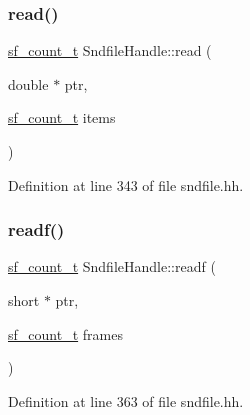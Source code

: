 \subsubsection{\texorpdfstring{read()}{read()}\hspace{0.1cm}{\footnotesize\ttfamily [4/4]}}
{\footnotesize\ttfamily \mbox{\hyperlink{sndfile_8h_af2b12fded74bc949f1f1f392a2af4892}{sf\+\_\+count\+\_\+t}} Sndfile\+Handle\+::read (\begin{DoxyParamCaption}\item[{double $\ast$}]{ptr,  }\item[{\mbox{\hyperlink{sndfile_8h_af2b12fded74bc949f1f1f392a2af4892}{sf\+\_\+count\+\_\+t}}}]{items }\end{DoxyParamCaption})\hspace{0.3cm}{\ttfamily [inline]}}



Definition at line 343 of file sndfile.\+hh.

\mbox{\label{class_sndfile_handle_aea11dfe64ff49f514068969cd8f8ed38}} 
\subsubsection{\texorpdfstring{readf()}{readf()}\hspace{0.1cm}{\footnotesize\ttfamily [1/4]}}
{\footnotesize\ttfamily \mbox{\hyperlink{sndfile_8h_af2b12fded74bc949f1f1f392a2af4892}{sf\+\_\+count\+\_\+t}} Sndfile\+Handle\+::readf (\begin{DoxyParamCaption}\item[{short $\ast$}]{ptr,  }\item[{\mbox{\hyperlink{sndfile_8h_af2b12fded74bc949f1f1f392a2af4892}{sf\+\_\+count\+\_\+t}}}]{frames }\end{DoxyParamCaption})\hspace{0.3cm}{\ttfamily [inline]}}



Definition at line 363 of file sndfile.\+hh.

\mbox{\label{class_sndfile_handle_a3484df57698b0fc6f8835c864e48c8e0}} 
